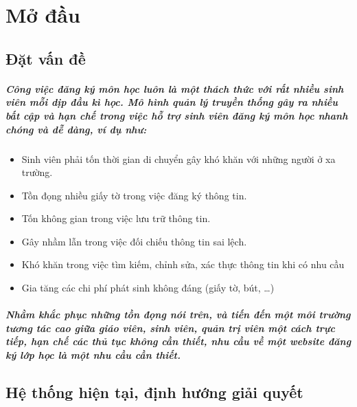 \documentclass[12pt]{book}
\begin{document}
\maketitle

\tableofcontents

\chapter{Mở đầu}

  \section{Đặt vấn đề}

  \paragraph{\textnormal{Công việc đăng ký môn học luôn là một thách thức với rất nhiều sinh viên mỗi dịp đầu kì học. Mô hình quản lý truyền thống gây ra nhiều bất cập và hạn chế trong việc hỗ trợ sinh viên đăng ký môn học nhanh chóng và dễ dàng, ví dụ như:}}
  \begin{itemize}
    \item Sinh viên phải tốn thời gian di chuyển gây khó khăn với những người ở xa trường.
    \item Tồn đọng nhiều giấy tờ trong việc đăng ký thông tin.
    \item Tốn không gian trong việc lưu trữ thông tin.
    \item Gây nhầm lẫn trong việc đối chiếu thông tin sai lệch.
    \item Khó khăn trong việc tìm kiếm, chỉnh sửa, xác thực thông tin khi có nhu cầu
    \item Gia tăng các chi phí phát sinh không đáng (giấy tờ, bút, \ldots)
  \end{itemize}

  \paragraph{\textnormal{Nhằm khắc phục những tồn đọng nói trên, và tiến đến một môi trường tương tác cao giữa giáo viên, sinh viên, quản trị viên một cách trực tiếp, hạn chế các thủ tục không cần thiết, nhu cầu về một website đăng ký lớp học là một nhu cầu cần thiết.}}

  \section{Hệ thống hiện tại, định hướng giải quyết}
\end{document}
